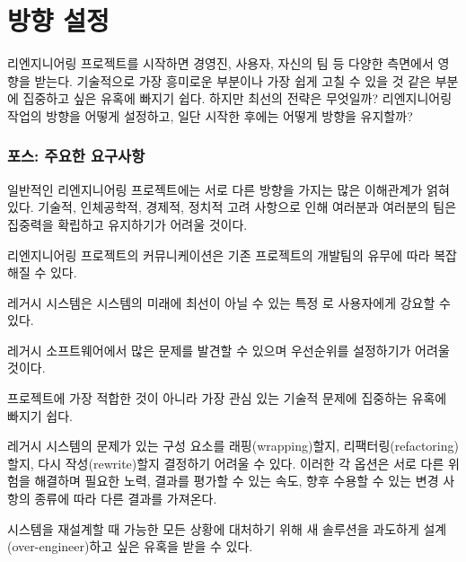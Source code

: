 \documentclass[a4paper,10pt,twoside]{book}
\begin{document}
	\renewcommand{\nnbb}[2]{} %
	\sloppy
\fi
\chapter{방향 설정}

리엔지니어링 프로젝트를 시작하면 경영진, 사용자, 자신의 팀 등 다양한 측면에서 영향을 받는다. 기술적으로 가장 흥미로운 부분이나 가장 쉽게 고칠 수 있을 것 같은 부분에 집중하고 싶은 유혹에 빠지기 쉽다. 하지만 최선의 전략은 무엇일까? 리엔지니어링 작업의 방향을 어떻게 설정하고, 일단 시작한 후에는 어떻게 방향을 유지할까?

\subsection*{포스: 주요한 요구사항}
\begin{bulletlist}
  \item 일반적인 리엔지니어링 프로젝트에는 서로 다른 방향을 가지는 많은 이해관계가 얽혀 있다. 기술적, 인체공학적, 경제적, 정치적 고려 사항으로 인해 여러분과 여러분의 팀은 집중력을 확립하고 유지하기가 어려울 것이다. 

  \item 리엔지니어링 프로젝트의 커뮤니케이션은 기존 프로젝트의 개발팀의 유무에 따라 복잡해질 수 있다.

  \item 레거시 시스템은 시스템의 미래에 최선이 아닐 수 있는 특정 로 사용자에게 강요할 수 있다.

  \item 레거시 소프트웨어에서 많은 문제를 발견할 수 있으며 우선순위를 설정하기가 어려울 것이다.

  \item 프로젝트에 가장 적합한 것이 아니라 가장 관심 있는 기술적 문제에 집중하는 유혹에 빠지기 쉽다.

  \item 레거시 시스템의 문제가 있는 구성 요소를 래핑(wrapping)할지, 리팩터링(refactoring)할지, 다시 작성(rewrite)할지 결정하기 어려울 수 있다. 이러한 각 옵션은 서로 다른 위험을 해결하며 필요한 노력, 결과를 평가할 수 있는 속도, 향후 수용할 수 있는 변경 사항의 종류에 따라 다른 결과를 가져온다.

  \item 시스템을 재설계할 때 가능한 모든 상황에 대처하기 위해 새 솔루션을 과도하게 설계(over-engineer)하고 싶은 유혹을 받을 수 있다.
\end{bulletlist}
\end{document}
